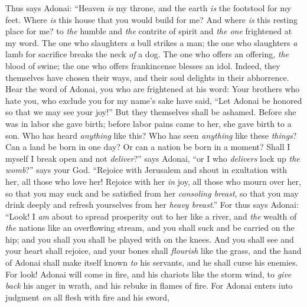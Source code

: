 \begin{biblechapter} %
 Thus says Adonai:
\verse “Heaven \textit{is} my throne, 
and the earth \textit{is} the footstool for my feet. 
Where \textit{is} this house that you would build for me? 
And where \textit{is} this resting place for me?
\verse to \textit{the} humble and \textit{the} contrite of spirit 
and \textit{the one} frightened at my word.
\verse The one who slaughters \textit{a} bull strikes a man; 
the one who slaughters \textit{a} lamb for sacrifice breaks the neck \textit{of} a dog. 
The one who offers an offering, \textit{the} blood of swine; 
the one who offers frankincense blesses an idol. 
Indeed, they themselves have chosen their ways, 
and their soul delights in their abhorrence.
\verse Hear the word of Adonai, you who are frightened at his word:
\verse Your brothers who hate you, 
who exclude you for my name’s sake have said, 
“Let Adonai be honored so that we may see your joy!” 
But they themselves shall be ashamed.
 Before she was in labor she gave birth; 
before labor pains came to her, she gave birth to a son.
\verse Who has heard \textit{anything} like this? 
Who has seen \textit{anything} like these \textit{things}? 
Can a land be born in one day? 
Or can a nation be born in a moment?
\verse Shall I myself I break open and not \textit{deliver}?” says Adonai, 
“or I who \textit{delivers} lock up \textit{the womb}?” says your God.
\verse “Rejoice with Jerusalem 
and shout in exultation with her, all those who love her! 
Rejoice with her \textit{in} joy, all those who mourn over her,
\verse so that you may suck and be satisfied from her \textit{consoling breast}, 
so that you may drink deeply and refresh yourselves from her \textit{heavy breast}.”
\verse For thus says Adonai:
\verse “Look! I \textit{am} about to spread prosperity out to her like a river, 
and \textit{the} wealth of \textit{the} nations like an overflowing stream, 
and you shall suck and be carried on the hip; 
and you shall you shall be played with on the knees.
 And you shall see and your heart shall rejoice, 
and your bones shall \textit{flourish} like the grass, 
and the hand of Adonai shall make itself known \textit{to} his servants, 
and he shall curse his enemies.
\verse For look! Adonai will come in fire, 
and his chariots like the storm wind, 
to \textit{give back} his anger in wrath, 
and his rebuke in flames of fire.
\verse For Adonai enters into judgment \textit{on} all flesh with fire and his sword, 

\end{biblechapter}
